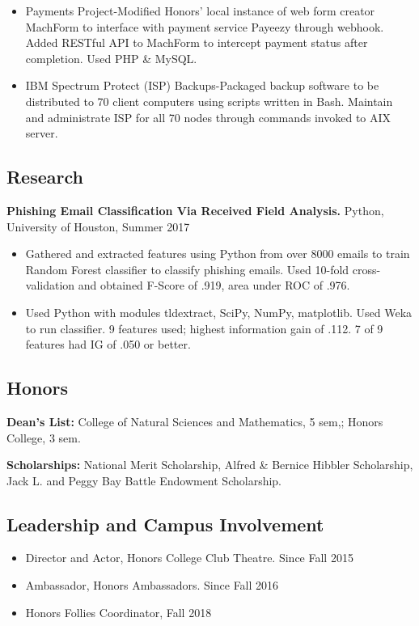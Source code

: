 \documentclass{article}
\begin{document}
\begin{itemize}[nosep]
\setlength\itemsep{0em}
\item  Payments Project-Modified Honors' local instance of web form creator MachForm to interface with payment service Payeezy through webhook. Added RESTful API to MachForm to intercept payment status after completion. Used PHP \& MySQL.

\item  IBM Spectrum Protect (ISP) Backups-Packaged backup software to be distributed to 70 client computers using scripts written in Bash. Maintain and administrate ISP for all 70 nodes through commands invoked to AIX server.
\end{itemize}

\noindent 
\subsection*{Research}

\noindent \textbf{Phishing Email Classification Via Received Field Analysis.} Python, University of Houston, Summer 2017

\begin{itemize}[nosep]
\setlength\itemsep{0em}
\item  Gathered and extracted features using Python from over 8000 emails to train Random Forest classifier to classify phishing emails. Used 10-fold cross-validation and obtained F-Score of .919, area under ROC of .976.

\item  Used Python with modules tldextract, SciPy, NumPy, matplotlib. Used Weka to run classifier. 9 features used; highest information gain of .112. 7 of 9 features had IG of .050 or better.
\end{itemize}

\subsection*{Honors}
\noindent\textbf{Dean's List:} College of Natural Sciences and Mathematics, 5 sem,; Honors College, 3 sem.

\noindent \textbf{Scholarships:} National Merit Scholarship, Alfred \& Bernice Hibbler Scholarship, Jack L. and Peggy Bay Battle Endowment Scholarship.

\noindent 
\subsection*{Leadership and Campus Involvement}

\begin{itemize}
\setlength\itemsep{0em}
\item \textbf{ }Director and Actor, Honors College Club Theatre. Since Fall 2015

\item  Ambassador, Honors Ambassadors. Since Fall 2016

\item  Honors Follies Coordinator, Fall 2018
\end{itemize}
\end{document}
